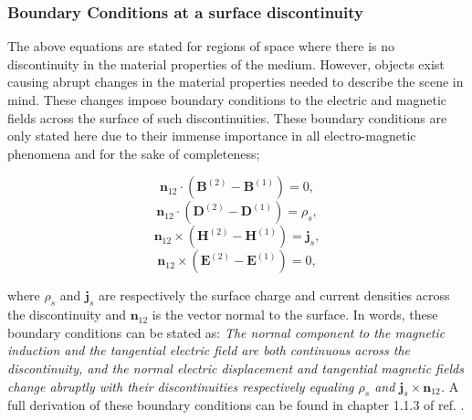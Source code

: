 \subsubsection{Boundary Conditions at a surface discontinuity\label{s2:BCs}}
The above equations are stated for regions of space where there is no discontinuity in the material properties of the medium. However, objects exist causing abrupt changes in the material properties needed to describe the scene in mind. These changes impose boundary conditions to the electric and magnetic fields across the surface of such discontinuities. These boundary conditions are only stated here due to their immense importance in all electro-magnetic phenomena and for the sake of completeness;
\begin{multicols}{2}
\begin{equation}
\mathbf{n}_{12}\cdot (\mathbf{B}^{(2)}-\mathbf{B}^{(1)})=0,
\label{eq2:BC1}
\end{equation}
\begin{equation}
\mathbf{n}_{12}\cdot (\mathbf{D}^{(2)}-\mathbf{D}^{(1)})=\rho_s,
\label{eq2:BC2}
\end{equation}
\begin{equation}
\mathbf{n}_{12}\times (\mathbf{H}^{(2)}-\mathbf{H}^{(1)})=\mathbf{j}_s,
\label{eq2:BC3}
\end{equation}
\begin{equation}
\mathbf{n}_{12}\times (\mathbf{E}^{(2)}-\mathbf{E}^{(1)})=0,
\label{eq2:BC4}
\end{equation}
\end{multicols} 
\noindent where $\rho_s$ and $\mathbf{j}_s$ are respectively the surface charge and current densities across the discontinuity and $\mathbf{n}_{12}$ is the vector normal to the surface. In words, these boundary conditions can be stated as: \textit{The normal component to the magnetic induction and the tangential electric field are both continuous across the discontinuity, and the normal electric displacement and tangential magnetic fields change abruptly with their discontinuities respectively equaling $\rho_s$ and $\mathbf{j}_s \times \mathbf{n}_{12}$.} A full derivation of these boundary conditions can be found in chapter 1.1.3 of ref. \cite{Wolf.Optics}.





